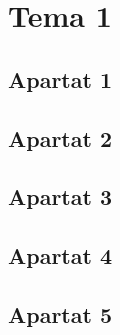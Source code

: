 \section{Tema 1}
\subsection{Apartat 1}

\subsection{Apartat 2}

\subsection{Apartat 3}

\subsection{Apartat 4}

\subsection{Apartat 5}